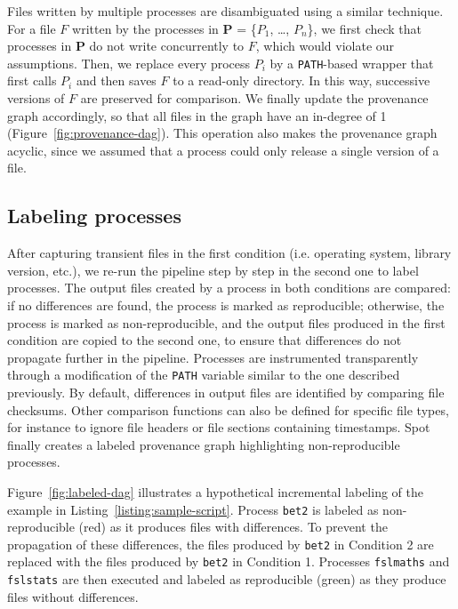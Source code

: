 \documentclass[a4paper,num-refs]{oup-contemporary}
\newcommand{\toolname}[0]{Spot\xspace}
\begin{document}
Files written by multiple processes are disambiguated using a similar technique. For a
 file $F$ written by the processes in \textbf{P} = \{$P_{1}$, \ldots,
 $P_{n}$\}, we first check that processes in \textbf{P} do not
 write concurrently to $F$, which would violate our assumptions. Then, we
 replace every process $P_{i}$ by a \texttt{PATH}-based wrapper that first
 calls $P_{i}$ and then saves $F$ to a read-only directory. In this way,
 successive versions of $F$ are preserved for comparison. We finally
 update the provenance graph accordingly, so that all files in the graph
 have an in-degree of 1 (Figure~\ref{fig:provenance-dag}). This operation also makes the provenance graph
 acyclic, since we assumed that a process could only release a single version of a file.

\subsection{Labeling processes}

After capturing transient files in the first condition (i.e. operating system, library version, etc.),
we re-run the pipeline
step by step in the second one to label processes. The output files
created by a process in both conditions are compared: if no differences are found, the process is marked as
reproducible; otherwise, the process is marked as non-reproducible, and the
output files produced in the first condition are copied to the second one, to ensure
that differences do not propagate further in the pipeline. Processes are
instrumented transparently through a modification of the \texttt{PATH}
variable similar to the one described previously. By default, differences
in output files are identified by comparing file checksums. Other
comparison functions can also be defined for specific file types, for
instance to ignore file headers or file sections containing timestamps.
\toolname finally creates a labeled
provenance graph highlighting non-reproducible processes.

Figure~\ref{fig:labeled-dag} illustrates a hypothetical incremental
labeling of the example in Listing~\ref{listing:sample-script}. Process
\texttt{bet2} is labeled as non-reproducible (red) as it produces files
with differences. To prevent the propagation of these differences, the
files produced by \texttt{bet2} in Condition 2 are replaced with the
files produced by \texttt{bet2} in Condition 1. Processes
\texttt{fslmaths} and \texttt{fslstats} are then executed and
labeled as reproducible (green) as they produce files without differences.
\end{document}
